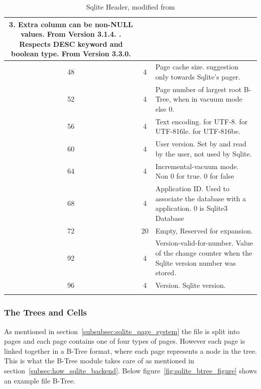 \begin{longtable}[h]{| c | c | p{10cm} |}
			3. Extra column can be non-NULL values. From Version 3.1.4. \newline
			4. Respects DESC keyword and boolean type. From Version 3.3.0. \newline \\
		\hline
			48 & 4 & Page cache size. suggestion only towards Sqlite's pager. \\
		\hline
			52 & 4 & Page number of largest root B-Tree, when in vacuum mode else 0. \\
		\hline
			56 & 4 & Text encoding. \newline
			 1 for UTF-8. \newline 
			 2 for UTF-816le. \newline 
			 3 for UTF-816be. \\
		\hline
			60 & 4 & User version. Set by and read by the user, not used by Sqlite. \\
		\hline
			64 & 4 & Incremental-vacuum mode. Non 0 for true. 0 for false \\
		\hline
			68 & 4 & Application ID. Used to associate the database with a application. 0 is Sqlite3 Database \\
		\hline
			72 & 20 & Empty, Reserved for expansion. \\
		\hline
			92 & 4 & Version-valid-for-number. Value of the change counter when the Sqlite version number was stored. \\
		\hline
			96 & 4 & Version. Sqlite version. \\
		\hline
	\caption{Sqlite Header, modified from \cite{sqlite}}
	\label{tbl:sqlite_header}
\end{longtable}

\subsubsection{The Trees and Cells}
\label{subsubsec:sqlite_trees_and_cells}

As mentioned in section~\ref{subsubsec:sqlite_page_system} the file is split into pages and each page contains one of four types of pages. However each page is linked together in a B-Tree format, where each page represents a node in the tree. This is what the B-Tree module takes care of as mentioned in section~\ref{subsec:how_sqlite_backend}. Below figure~\ref{fig:sqlite_btree_figure} shows an example file B-Tree.

